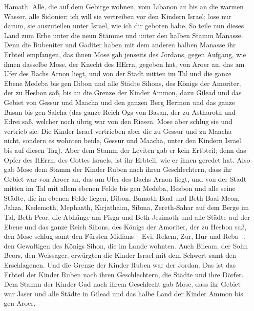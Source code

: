 Hamath.  Alle, die auf dem Gebirge wohnen, vom Libanon an
bis an die warmen Wasser, alle Sidonier: ich will sie vertreiben vor den
Kindern Israel; lose nur darum, sie auszuteilen unter Israel, wie ich
dir geboten habe.  So teile nun dieses Land zum Erbe unter
die neun Stämme und unter den halben Stamm Manasse.  Denn
die Rubeniter und Gaditer haben mit dem anderen halben Manasse ihr
Erbteil empfangen, das ihnen Mose gab jenseits des Jordans, gegen
Aufgang, wie ihnen dasselbe Mose, der Knecht des HErrn, gegeben hat,
 von Aroer an, das am Ufer des Bachs Arnon liegt, und von
der Stadt mitten im Tal und die ganze Ebene Medeba bis gen Dibon
 und alle Städte Sihons, des Königs der Amoriter, der zu
Hesbon saß, bis an die Grenze der Kinder Ammon,  dazu
Gilead und das Gebiet von Gessur und Maacha und den ganzen Berg Hermon
und das ganze Basan bis gen Salcha  (das ganze Reich Ogs
von Basan, der zu Astharoth und Edrei saß, welcher noch übrig war von
den Riesen. Mose aber schlug sie und vertrieb sie.  Die
Kinder Israel vertrieben aber die zu Gessur und zu Maacha nicht, sondern
es wohnten beide, Gessur und Maacha, unter den Kindern Israel bis auf
diesen Tag).  Aber dem Stamm der Leviten gab er kein
Ertbteil; denn das Opfer des HErrn, des Gottes Israels, ist ihr Erbteil,
wie er ihnen geredet hat.  Also gab Mose dem Stamm der
Kinder Ruben nach ihren Geschlechtern,  dass ihr Gebiet war
von Aroer an, das am Ufer des Bachs Arnon liegt, und von der Stadt
mitten im Tal mit allem ebenen Felde bis gen Medeba, 
Hesbon und alle seine Städte, die im ebenen Felde liegen, Dibon,
Bamoth-Baal und Beth-Baal-Meon,  Jahza, Kedemoth, Mephaath,
 Kirjathaim, Sibma, Zereth-Sahar auf dem Berge im Tal,
 Beth-Peor, die Abhänge am Pisga und Beth-Jesimoth
 und alle Städte auf der Ebene und das ganze Reich Sihons,
des Königs der Amoriter, der zu Hesbon saß, den Mose schlug samt den
Fürsten Midians -- Evi, Rekem, Zur, Hur und Reba --, den Gewaltigen des
Königs Sihon, die im Lande wohnten.  Auch Bileam, der Sohn
Beors, den Weissager, erwürgten die Kinder Israel mit dem Schwert samt
den Erschlagenen.  Und die Grenze der Kinder Ruben war der
Jordan. Das ist das Erbteil der Kinder Ruben nach ihren Geschlechtern,
die Städte und ihre Dörfer.  Dem Stamm der Kinder Gad nach
ihrem Geschlecht gab Mose,  dass ihr Gebiet war Jaser und
alle Städte in Gilead und das halbe Land der Kinder Ammon bis gen Aroer,
